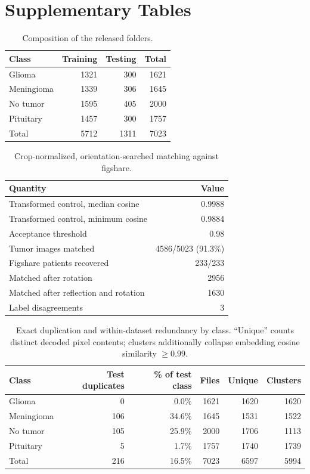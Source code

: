 ﻿\documentclass[11pt]{article}
\begin{document}
\section*{Supplementary Tables}
\begin{table}[H]
\centering
\caption{Composition of the released folders.}
\label{tab:s_dataset}
\begin{tabular}{lrrr}
\toprule
Class & Training & Testing & Total \\
\midrule
Glioma & 1321 & 300 & 1621 \\
Meningioma & 1339 & 306 & 1645 \\
No tumor & 1595 & 405 & 2000 \\
Pituitary & 1457 & 300 & 1757 \\
\midrule
Total & 5712 & 1311 & 7023 \\
\bottomrule
\end{tabular}
\end{table}

\begin{table}[H]
\centering
\caption{Crop-normalized, orientation-searched matching against figshare.}
\label{tab:s_provenance}
\begin{tabular}{lr}
\toprule
Quantity & Value \\
\midrule
Transformed control, median cosine & 0.9988 \\
Transformed control, minimum cosine & 0.9884 \\
Acceptance threshold & 0.98 \\
Tumor images matched & 4586/5023 (91.3\%) \\
Figshare patients recovered & 233/233 \\
Matched after rotation & 2956 \\
Matched after reflection and rotation & 1630 \\
Label disagreements & 3 \\
\bottomrule
\end{tabular}
\end{table}

\begin{table}[H]
\centering
\caption{Exact duplication and within-dataset redundancy by class. ``Unique'' counts distinct decoded pixel contents; clusters additionally collapse embedding cosine similarity $\geq0.99$.}
\label{tab:s_duplicates}
\small
\begin{tabular}{lrrrrr}
\toprule
Class & Test duplicates & \% of test class & Files & Unique & Clusters \\
\midrule
Glioma & 0 & 0.0\% & 1621 & 1620 & 1620 \\
Meningioma & 106 & 34.6\% & 1645 & 1531 & 1522 \\
No tumor & 105 & 25.9\% & 2000 & 1706 & 1113 \\
Pituitary & 5 & 1.7\% & 1757 & 1740 & 1739 \\
\midrule
Total & 216 & 16.5\% & 7023 & 6597 & 5994 \\
\bottomrule
\end{tabular}
\end{table}
\end{document}
